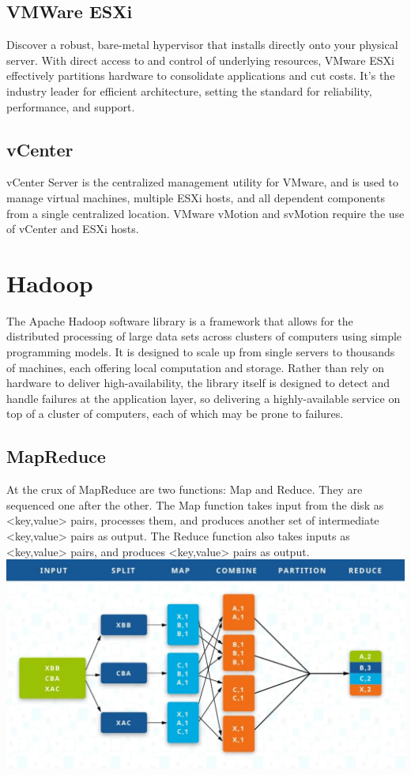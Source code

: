 \subsection{VMWare ESXi}
Discover a robust, bare-metal hypervisor that installs directly onto your physical server. With direct access to and control of underlying resources, VMware ESXi effectively partitions hardware to consolidate applications and cut costs. It’s the industry leader for efficient architecture, setting the standard for reliability, performance, and support.\autocite{VMware2023}

\subsection{vCenter}
vCenter Server is the centralized management utility for VMware, and is used to manage virtual machines, multiple ESXi hosts, and all dependent components from a single centralized location. VMware vMotion and svMotion require the use of vCenter and ESXi hosts.\autocite{Abbas2023}

\section{Hadoop}
The Apache Hadoop software library is a framework that allows for the distributed processing of large data sets across clusters of computers using simple programming models. It is designed to scale up from single servers to thousands of machines, each offering local computation and storage. Rather than rely on hardware to deliver high-availability, the library itself is designed to detect and handle failures at the application layer, so delivering a highly-available service on top of a cluster of computers, each of which may be prone to failures.\autocite{ASF2022}

\subsection{MapReduce}
At the crux of MapReduce are two functions: Map and Reduce. They are sequenced one after the other.
The Map function takes input from the disk as <key,value> pairs, processes them, and produces another set of intermediate <key,value> pairs as output.
The Reduce function also takes inputs as <key,value> pairs, and produces <key,value> pairs as output. \autocite{Talend2023}
\includegraphics{mapreduce.png}

